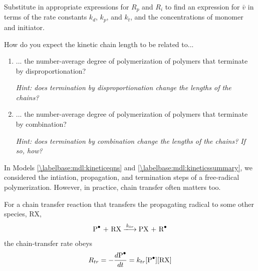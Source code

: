\begin{activity}
\begin{ctqs}
	\question Substitute in appropriate expressions for $R_p$ and $R_i$ to find an expression for $\bar v$ in terms of the rate constants $k_d$, $k_p$, and $k_t$, and the concentrations of monomer and initiator.
	
		\begin{solution}[2.5in]
		\end{solution}
		
	\question How do you expect the kinetic chain length to be related to...
		
		\begin{enumerate}
		
			\item ... the number-average degree of polymerization of polymers that terminate by disproportionation?
			
				\emph{Hint: does termination by disproportionation change the lengths of the chains?}
				
				\begin{solution}[1in]
				\end{solution}
			
			\item ... the number-average degree of polymerization of polymers that terminate by combination?
			
				\emph{Hint: does termination by combination change the lengths of the chains?  If so, how?}
				
				\begin{solution}[1in]
				\end{solution}
		
		\end{enumerate}

\end{ctqs}

		
\clearpage
\begin{model}
\label{\labelbase:mdl:chainxfer}

	In Models \ref{\labelbase:mdl:kineticeqns} and \ref{\labelbase:mdl:kineticssummary}, we considered the intiation, propagation, and termination steps of a free-radical polymerization.  However, in practice, chain transfer often matters too.
	
	For a chain transfer reaction that transfers the propagating radical to some other species, RX,
	\begin{align*}
		\text{\ce{P^.} + RX} \xlongrightarrow{k_{tr}} \text{PX + \ce{R^.}}
	\end{align*}
	the chain-transfer rate obeys
	\begin{align*}
		R_{tr} = -\frac{d\text{\ce{P^.}}}{dt} = k_{tr}\text{[\ce{P^.}][RX]}
	\end{align*}
	

\end{model}
\end{activity}
